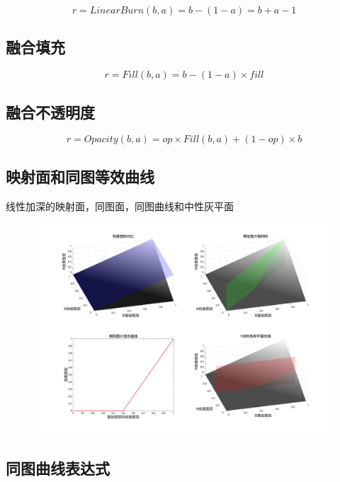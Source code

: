 \begin{equation}r=LinearBurn(b,a)=b-(1-a)=b+a-1\end{equation}

\subsection{ 融合填充}


\begin{equation}r= Fill(b,a) =b-(1-a)\times fill\end{equation}

\subsection{ 融合不透明度}


\begin{equation}r=Opacity(b,a)=op\times Fill(b,a)+(1-op)\times b\end{equation}

\subsection{ 映射面和同图等效曲线}

线性加深的映射面，同图面，同图曲线和中性灰平面
\begin{figure}[!htb]
	\centering
	\includegraphics[width=\linewidth]{figure/线性加深.jpg}
	\caption{}
	\label{fig:}
\end{figure}


\subsection{ 同图曲线表达式}


